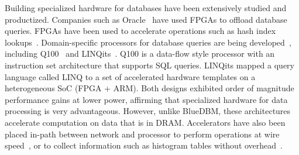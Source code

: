 Building specialized hardware for databases have been extensively studied and
productized. Companies such as Oracle~\cite{exadata} 
have used FPGAs to offload database queries.
FPGAs have been used to accelerate operations such as hash index
lookups~\cite{walkers}. Domain-specific processors for database queries are
being developed~\cite{databasefpga, hybridsql}, including Q100~\cite{q100} and LINQits~\cite{linqits}.
Q100 is a data-flow style processor with an instruction set architecture that
supports SQL queries. LINQits mapped a query language called LINQ to a set of
accelerated hardware templates on a heterogeneous SoC (FPGA + ARM). Both designs
exhibited order of magnitude performance gains at lower power, affirming that
specialized hardware for data processing is very advantageous.
However, unlike BlueDBM, these architectures accelerate computation on data that is in DRAM.
Accelerators have also been placed in-path between network and processor to perform operations
at wire speed~\cite{fpgastreamquery}, or to collect information such as
histogram tables without overhead~\cite{histogramssideeffect}.

